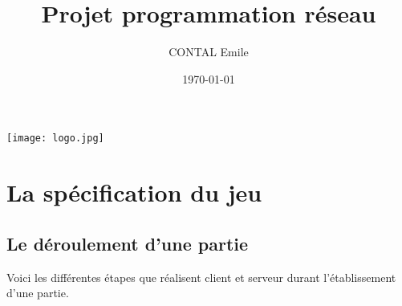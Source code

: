 \documentclass{article}
\author{CONTAL Emile}
\title{Projet programmation réseau}
\date{\today}
\begin{document}
\maketitle

\begin{center}
\texttt{[image: logo.jpg]}
\end{center}


\let\thefootnote\relax{}
\newcommand{\thefootnote}{\arabic{footnote}}

\section{La spécification du jeu}
\subsection{Le déroulement d'une partie}
Voici les différentes étapes que réalisent client et serveur durant l'établissement d'une partie.
\end{document}
